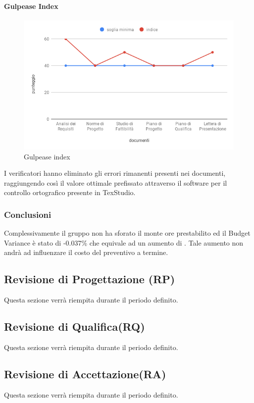 \paragraph{Gulpease Index}
\hspace{15cm}
\begin{figure}[!htbp]
	\centering
	\includegraphics[scale=0.5]{GulpeaseIndex.png}
	\caption{Gulpease index}
\end{figure}

 I verificatori hanno eliminato gli errori rimanenti presenti nei documenti, raggiungendo così il valore ottimale prefissato attraverso il software per il controllo ortografico presente in TexStudio. 
 
\subsubsection{Conclusioni}
Complessivamente il gruppo non ha sforato il monte ore prestabilito ed il Budget Variance è stato di -0.037\% che equivale ad un aumento di . Tale aumento non andrà ad influenzare il costo del preventivo a termine. 
\clearpage
\subsection{Revisione di Progettazione (RP)}
Questa sezione verrà riempita durante il periodo definito.
\subsection{Revisione di Qualifica(RQ)}
Questa sezione verrà riempita durante il periodo definito.
\subsection{Revisione di Accettazione(RA)}
Questa sezione verrà riempita durante il periodo definito.

